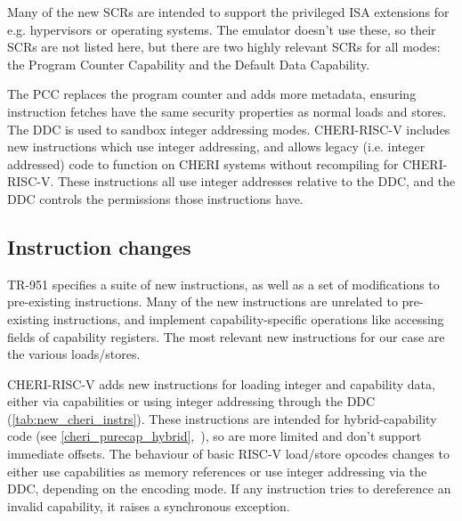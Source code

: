 Many of the new SCRs are intended to support the privileged ISA extensions for e.g. hypervisors or operating systems.
The emulator doesn't use these, so their SCRs are not listed here, but there are two highly relevant SCRs for all modes: the Program Counter Capability and the Default Data Capability.

The PCC replaces the program counter and adds more metadata, ensuring instruction fetches have the same security properties as normal loads and stores.
The DDC is used to sandbox integer addressing modes.
CHERI-RISC-V includes new instructions which use integer addressing, and allows legacy (i.e. integer addressed) code to function on CHERI systems without recompiling for CHERI-RISC-V.
These instructions all use integer addresses relative to the DDC, and the DDC controls the permissions those instructions have.

\subsection{Instruction changes}\label{cheri_instructions}
TR-951\cite[Chapter~8]{TR-951} specifies a suite of new instructions, as well as a set of modifications to pre-existing instructions.
Many of the new instructions are unrelated to pre-existing instructions, and implement capability-specific operations like accessing fields of capability registers.
The most relevant new instructions for our case are the various loads/stores.

\pagebreak
CHERI-RISC-V adds new instructions for loading integer and capability data, either via capabilities or using integer addressing through the DDC (\cref{tab:new_cheri_instrs}).
These instructions are intended for hybrid-capability code (see \cref{cheri_purecap_hybrid},~\cite[p151]{TR-951}), so are more limited and don't support immediate offsets.
The behaviour of basic RISC-V load/store opcodes changes to either use capabilities as memory references or use integer addressing via the DDC, depending on the encoding mode.
If any instruction tries to dereference an invalid capability, it raises a synchronous exception.

